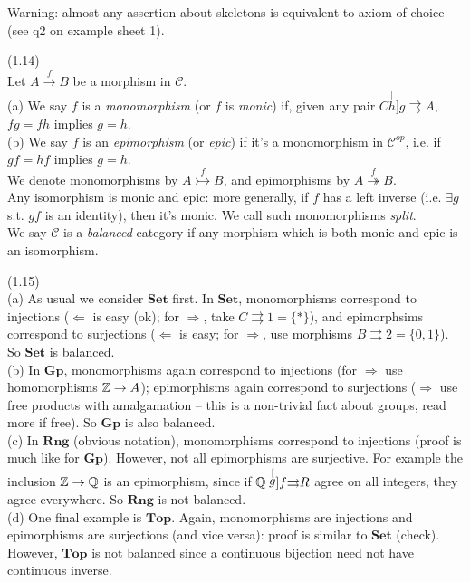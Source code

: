 \documentclass[a4paper]{article}
\begin{document}
Warning: almost any assertion about skeletons is equivalent to axiom of choice (see q2 on example sheet 1).

\begin{defi} (1.14)\\
    Let $A \xrightarrow{f} B$ be a morphism in $\mathcal{C}$.\\
    (a) We say $f$ is a \emph{monomorphism} (or $f$ is \emph{monic}) if, given any pair $C \stackrel[h]{g}{\rightrightarrows} A$, $fg=fh$ implies $g=h$.\\
    (b) We say $f$ is an \emph{epimorphism} (or \emph{epic}) if it's a monomorphism in $\mathcal{C}^{op}$, i.e. if $gf = hf$ implies $g=h$.\\
    We denote monomorphisms by $A \stackrel{f}{\rightarrowtail} B$, and epimorphisms by $A \stackrel{f}{\twoheadrightarrow} B$.\\
    Any isomorphism is monic and epic: more generally, if $f$ has a left inverse (i.e. $\exists g$ s.t. $gf$ is an identity), then it's monic. We call such monomorphisms \emph{split}.\\
    We say $\mathcal{C}$ is a \emph{balanced} category if any morphism which is both monic and epic is an isomorphism.
\end{defi}

\begin{eg} (1.15)\\
    (a) As usual we consider $\mathbf{Set}$ first. In $\mathbf{Set}$, monomorphisms correspond to injections ($\Leftarrow$ is easy (ok); for $\Rightarrow$, take $C \rightrightarrows 1 = \{*\}$), and epimorphsims correspond to surjections ($\Leftarrow$ is easy; for $\Rightarrow$, use morphisms $B \rightrightarrows 2 = \{0,1\}$). So $\mathbf{Set}$ is balanced.\\
    (b) In $\mathbf{Gp}$, monomorphisms again correspond to injections (for $\Rightarrow$ use homomorphisms $\mathbb{Z} \to A$); epimorphisms again correspond to surjections ($\Rightarrow$ use free products with amalgamation -- this is a non-trivial fact about groups, read more if free). So $\mathbf{Gp}$ is also balanced.\\
    (c) In $\mathbf{Rng}$ (obvious notation), monomorphisms correspond to injections (proof is much like for $\mathbf{Gp}$). However, not all epimorphisms are surjective. For example the inclusion $\mathbb{Z} \to \mathbb{Q}$ is an epimorphism, since if $\mathbb{Q} \stackrel[g]{f}{\rightrightarrows} R$ agree on all integers, they agree everywhere. So $\mathbf{Rng}$ is not balanced.\\
    (d) One final example is $\mathbf{Top}$. Again, monomorphisms are injections and epimorphisms are surjections (and vice versa): proof is similar to $\mathbf{Set}$ (check). However, $\mathbf{Top}$ is not balanced since a continuous bijection need not have continuous inverse.
\end{eg}
\end{document}
